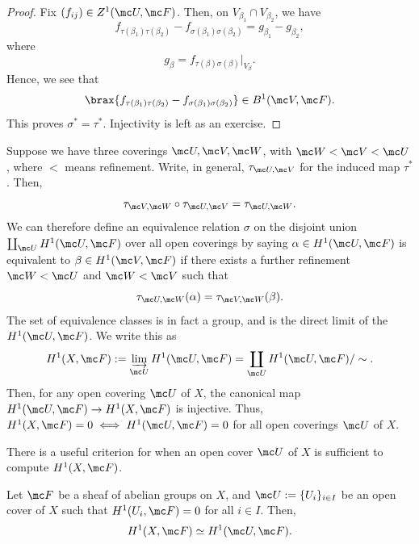\documentclass[11pt]{report}
\begin{document}
\begin{proof}
    Fix $(f_{ij}) \in Z^1(\mc U, \mc F)$. Then, on $V_{\beta _1}\cap V_{\beta_2}$, we have
    \[
    f_{\tau(\beta_1)\tau(\beta_2)}-f_{\sigma(\beta_1)\sigma(\beta_2)}= g_{\beta_1}-g_{\beta_2},
    \]
    where
    \[
    g_{\beta}=f_{\tau(\beta)\sigma(\beta)}|_{V_\beta}.
    \]
    Hence, we see that
    \[
    \brax{ f_{\tau(\beta _1)\tau(\beta_2)} - f_{\sigma(\beta _1)\sigma(\beta _2)}} \in B^1(\mc V, \mc F).
    \]
    This proves $\sigma^* = \tau^*$. Injectivity is left as an exercise.
\end{proof}

Suppose we have three coverings $\mc U,\mc V, \mc W$, with $\mc W < \mc V < \mc U$, where $<$ means refinement. Write, in general, $\tau_{\mc U,\mc V}$ for the induced map $\tau ^*$. Then,
\[
\tau_{\mc V,\mc W} \circ \tau_{\mc U, \mc V} = \tau_{\mc U, \mc W}.
\]
We can therefore define an equivalence relation $\sigma$ on the disjoint union $\coprod_{\mc U} H^1(\mc U,\mc F)$ over all open coverings by saying $\alpha \in H^1(\mc U,\mc F)$ is equivalent to $\beta \in H^1(\mc V, \mc F)$ if there exists a further refinement $\mc W < \mc U$ and $\mc W < \mc V$ such that
\[
\tau_{\mc U,\mc W}(\alpha)= \tau_{\mc V,\mc W}(\beta).
\]
The set of equivalence classes is in fact a group, and is the direct limit of the $H^1(\mc U,\mc F)$. We write this as
\[
H^1(X, \mc F):= \varinjlim_{\mc U} H^1(\mc U,\mc F)= \coprod_{\mc U}H^{1}(\mc U, \mc F)/\sim.
\]
Then, for any open covering $\mc U$ of $X$, the canonical map $H^1(\mc U,\mc F)\to H^1(X,\mc F)$ is injective. Thus, $H^1(X,\mc F)=0 \iff H^1(\mc U,\mc F)=0$ for all open coverings $\mc U$ of $X$.

There is a useful criterion for when an open cover $\mc U$ of $X$ is sufficient to compute $H^1(X,\mc F)$.

\begin{thm}
Let $\mc F$ be a sheaf of abelian groups on $X$, and $\mc U:= \{U_i\}_{i \in I}$ be an open cover of $X$ such that $H^{1}(U_i, \mc F)=0$ for all $i \in I$. Then,
\[
H^1(X,\mc F) \simeq H^1(\mc U,\mc F).
\]
\end{thm}
\end{document}
